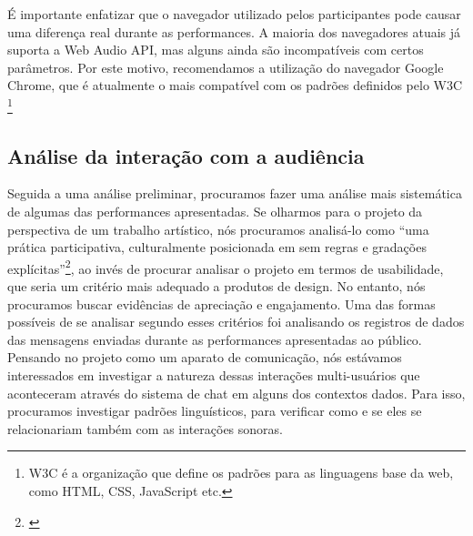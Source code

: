 É importante enfatizar que o navegador utilizado pelos participantes pode causar uma diferença real durante as performances. A maioria dos navegadores atuais já suporta a Web Audio API, mas alguns ainda são incompatíveis com certos parâmetros. Por este motivo, recomendamos a utilização do navegador Google Chrome, que é atualmente o mais compatível com os padrões definidos pelo W3C \footnote{W3C é a organização que define os padrões para as linguagens base da web, como HTML, CSS, JavaScript etc.}


%


\subsection{Análise da interação com a audiência}

Seguida a uma análise preliminar, procuramos fazer uma análise mais sistemática de algumas das performances apresentadas. Se olharmos para o projeto da perspectiva de um trabalho artístico, nós procuramos analisá-lo como ``uma prática participativa, culturalmente posicionada em sem regras e gradações explícitas''\footnote{\cite{McCullough1998}}, ao invés de procurar analisar o projeto em termos de usabilidade, que seria um critério mais adequado a produtos de design. No entanto, nós procuramos buscar evidências de apreciação e engajamento. Uma das formas possíveis de se analisar segundo esses critérios foi analisando os registros de dados das mensagens enviadas durante as performances apresentadas ao público. Pensando no projeto como um aparato de comunicação, nós estávamos interessados em investigar a natureza dessas interações multi-usuários que aconteceram através do sistema de chat em alguns dos contextos dados. Para isso, procuramos investigar padrões linguísticos, para verificar como e se eles se relacionariam também com as interações sonoras.



